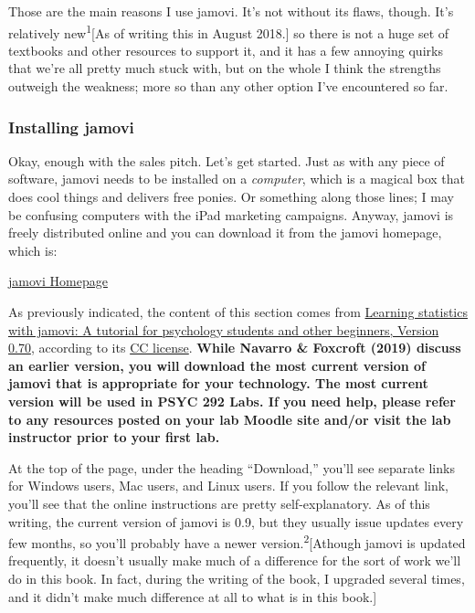 \documentclass[
]{book}
\begin{document}
Those are the main reasons I use jamovi. It's not without its flaws, though. It's relatively new\textsuperscript{1}{[}As of writing this in August 2018.{]} so there is not a huge set of textbooks and other resources to support it, and it has a few annoying quirks that we're all pretty much stuck with, but on the whole I think the strengths outweigh the weakness; more so than any other option I've encountered so far.

\hypertarget{installing-jamovi}{%
\subsubsection{Installing jamovi}\label{installing-jamovi}}

Okay, enough with the sales pitch. Let's get started. Just as with any piece of software, jamovi needs to be installed on a \emph{computer}, which is a magical box that does cool things and delivers free ponies. Or something along those lines; I may be confusing computers with the iPad marketing campaigns. Anyway, jamovi is freely distributed online and you can download it from the jamovi homepage, which is:

\href{https://www.jamovi.org/}{jamovi Homepage}

As previously indicated, the content of this section comes from \href{https://www.learnstatswithjamovi.com/}{Learning statistics with jamovi: A tutorial for psychology students and other beginners, Version 0.70}, according to its \href{https://creativecommons.org/licenses/by-sa/4.0/deed.ast}{CC license}. \textbf{While Navarro \& Foxcroft (2019) discuss an earlier version, you will download the most current version of jamovi that is appropriate for your technology. The most current version will be used in PSYC 292 Labs. If you need help, please refer to any resources posted on your lab Moodle site and/or visit the lab instructor prior to your first lab.}

At the top of the page, under the heading ``Download,'' you'll see separate links for Windows users, Mac users, and Linux users. If you follow the relevant link, you'll see that the online instructions are pretty self-explanatory. As of this writing, the current version of jamovi is 0.9, but they usually issue updates every few months, so you'll probably have a newer version.\textsuperscript{2}{[}Athough jamovi is updated frequently, it doesn't usually make much of a difference for the sort of work we'll do in this book. In fact, during the writing of the book, I upgraded several times, and it didn't make much difference at all to what is in this book.{]}
\end{document}
